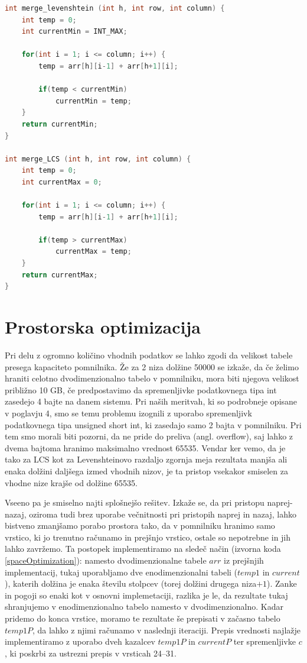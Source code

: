 \documentclass[a4paper,12pt,openright]{book}
\begin{document}
\bigskip
\begin{lstlisting}[language=C++, caption={Združevalni funkciji za Levenshteinovo razdaljo in LCS.}, captionpos=b, label=merge]
int merge_levenshtein (int h, int row, int column) {
    int temp = 0;
    int currentMin = INT_MAX;

    for(int i = 1; i <= column; i++) {
        temp = arr[h][i-1] + arr[h+1][i];

        if(temp < currentMin)
            currentMin = temp;
    }
    return currentMin;
}

int merge_LCS (int h, int row, int column) {
    int temp = 0;
    int currentMax = 0;

    for(int i = 1; i <= column; i++) {
        temp = arr[h][i-1] + arr[h+1][i];

        if(temp > currentMax)
            currentMax = temp;
    }
    return currentMax;
}
\end{lstlisting}

\section{Prostorska optimizacija}

Pri delu z ogromno količino vhodnih podatkov se lahko zgodi da velikost tabele presega kapaciteto pomnilnika. Že za 2 niza dolžine 50000 se izkaže, da če želimo hraniti celotno dvodimenzionalno tabelo v pomnilniku, mora biti njegova velikost približno 10 GB, če predpostavimo da spremenljivke podatkovnega tipa int zasedejo 4 bajte na danem sistemu. Pri naših meritvah, ki so podrobneje opisane v poglavju 4, smo se temu problemu izognili z uporabo spremenljivk podatkovnega tipa unsigned short int, ki zasedajo samo 2 bajta v pomnilniku. Pri tem smo morali biti pozorni, da ne pride do preliva (angl. overflow), saj lahko z dvema bajtoma hranimo maksimalno vrednost 65535. Vendar ker vemo, da je tako za LCS kot za Levenshteinovo razdaljo zgornja meja rezultata manjša ali enaka dolžini daljšega izmed vhodnih nizov, je ta pristop vsekakor smiselen za vhodne nize krajše od dolžine 65535. 

Vseeno pa je smiselno najti splošnejšo rešitev. Izkaže se, da pri pristopu naprej-nazaj, oziroma tudi brez uporabe večnitnosti pri pristopih naprej in nazaj, lahko bistveno zmanjšamo porabo prostora tako, da v pomnilniku hranimo samo vrstico, ki jo trenutno računamo in prejšnjo vrstico, ostale so nepotrebne in jih lahko zavržemo. Ta postopek implementiramo na sledeč način (izvorna koda \ref{spaceOptimization}): namesto dvodimenzionalne tabele $arr$ iz prejšnjih implementacij, tukaj uporabljamo dve enodimenzionalni tabeli ($temp1$ in $current$), katerih dolžina je enaka številu stolpcev (torej dolžini drugega niza$+ 1$). Zanke in pogoji so enaki kot v osnovni implemetaciji, razlika je le, da rezultate tukaj shranjujemo v enodimenzionalno tabelo namesto v dvodimenzionalno. Kadar pridemo do konca vrstice, moramo te rezultate še prepisati v začasno tabelo $temp1P$, da lahko z njimi računamo v naslednji iteraciji. Prepis vrednosti najlažje implementiramo z uporabo dveh kazalcev $temp1P$ in $currentP$ ter spremenljivke $c$, ki poskrbi za ustrezni prepis v vrsticah 24--31. 
\end{document}
